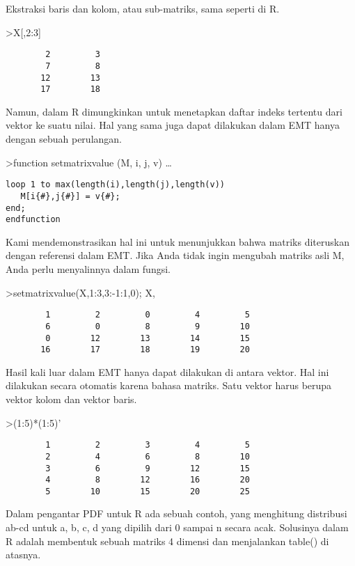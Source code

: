 \documentclass[
]{book}
\begin{document}
Ekstraksi baris dan kolom, atau sub-matriks, sama seperti di R.

\textgreater X{[},2:3{]}

\begin{verbatim}
        2         3 
        7         8 
       12        13 
       17        18 
\end{verbatim}

Namun, dalam R dimungkinkan untuk menetapkan daftar indeks tertentu dari vektor ke suatu nilai. Hal yang sama juga dapat dilakukan dalam EMT hanya dengan sebuah perulangan.

\textgreater function setmatrixvalue (M, i, j, v) \ldots{}

\begin{verbatim}
loop 1 to max(length(i),length(j),length(v))
   M[i{#},j{#}] = v{#};
end;
endfunction
\end{verbatim}

Kami mendemonstrasikan hal ini untuk menunjukkan bahwa matriks diteruskan dengan referensi dalam EMT. Jika Anda tidak ingin mengubah matriks asli M, Anda perlu menyalinnya dalam fungsi.

\textgreater setmatrixvalue(X,1:3,3:-1:1,0); X,

\begin{verbatim}
        1         2         0         4         5 
        6         0         8         9        10 
        0        12        13        14        15 
       16        17        18        19        20 
\end{verbatim}

Hasil kali luar dalam EMT hanya dapat dilakukan di antara vektor. Hal ini dilakukan secara otomatis karena bahasa matriks. Satu vektor harus berupa vektor kolom dan vektor baris.

\textgreater(1:5)*(1:5)'

\begin{verbatim}
        1         2         3         4         5 
        2         4         6         8        10 
        3         6         9        12        15 
        4         8        12        16        20 
        5        10        15        20        25 
\end{verbatim}

Dalam pengantar PDF untuk R ada sebuah contoh, yang menghitung distribusi ab-cd untuk a, b, c, d yang dipilih dari 0 sampai n secara acak. Solusinya dalam R adalah membentuk sebuah matriks 4 dimensi dan menjalankan table() di atasnya.
\end{document}
